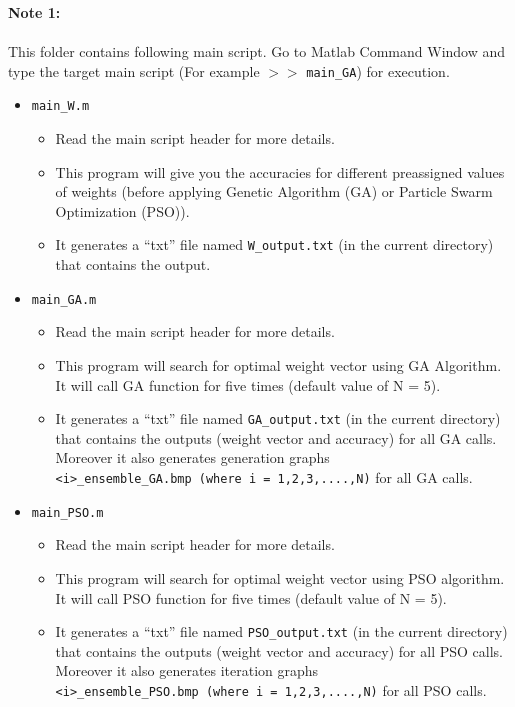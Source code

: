 \documentclass[a4paper,12pt]{article} %
\begin{document}
\textbf{Note 1:}\\\\
This folder contains following main script. Go to Matlab Command Window and type the target main script (For example $>>$  \verb|main_GA|) for execution.
\begin{itemize}
	\item \verb|main_W.m|   
		\begin{itemize}
		\item Read the main script header for more details.
		\item This program will give you the accuracies for different preassigned values of weights (before applying Genetic Algorithm (GA) or Particle Swarm Optimization (PSO)).
		
		\item It generates a ``txt'' file named \verb|W_output.txt| (in the current directory) that contains the output.	
			
		\end{itemize}
	\item \verb|main_GA.m|  
		\begin{itemize}
			\item Read the main script header for more details.
			\item This program will search for optimal weight vector using GA Algorithm. It will call GA function for five times (default value of N = 5).  
			
			\item It generates a ``txt'' file named \verb|GA_output.txt| (in the current directory) that contains the outputs (weight vector and accuracy) for all GA calls. Moreover it also generates generation graphs \\\verb|<i>_ensemble_GA.bmp (where i = 1,2,3,....,N)| for all GA calls.	
		\end{itemize}
		
	\item \verb|main_PSO.m|
	\begin{itemize}
		\item Read the main script header for more details.
		\item This program will search for optimal weight vector using PSO algorithm. It will call PSO function for five times (default value of N = 5).  
			
		\item It generates a ``txt'' file named \verb|PSO_output.txt| (in the current directory) that contains the outputs (weight vector and accuracy) for all PSO calls. Moreover it also generates iteration graphs \\\verb|<i>_ensemble_PSO.bmp (where i = 1,2,3,....,N)| for all PSO calls.	
	\end{itemize}
		
\end{itemize}
\end{document}
